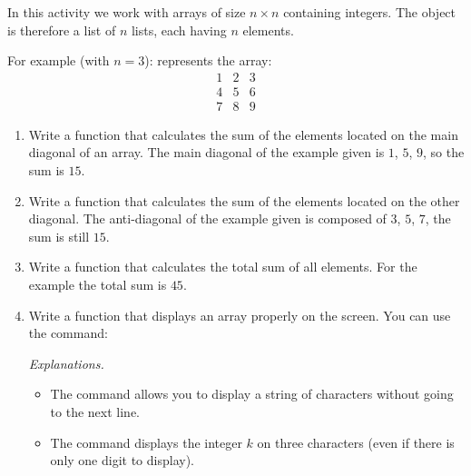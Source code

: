 \documentclass[11pt,class=report,crop=false]{standalone}
\begin{document}

\begin{activite}[Arrays]


In this activity we work with arrays of size $n \times n$ containing integers.
The object  is therefore a list of $n$ lists, each having $n$ elements.

For example (with $n=3$): 
represents the array:
$$\begin{array}{ccc}1&2&3\\4&5&6\\7&8&9\end{array}$$

\begin{enumerate}
  \item Write a function  that calculates the sum of the elements located on the main diagonal of an array.
  The main diagonal of the example given is $1$, $5$, $9$, so the sum is $15$.
  
  \item Write a function  that calculates the sum of the elements located on the other diagonal.
  The anti-diagonal of the example given is composed of $3$, $5$, $7$, the sum is still $15$.
  
  \item Write a function  that calculates the total sum of all elements. For the example the total sum is $45$.
  
  \item Write a function  that displays an array properly on the screen. You can use the command:

\emph{Explanations.}
\begin{itemize}
  \item The command  allows you to display a string of characters without going to the next line.
  
  \item The command  displays the integer $k$ on three characters (even if there is only one digit to display).
\end{itemize}  
\end{enumerate}

\end{activite}
\end{document}
